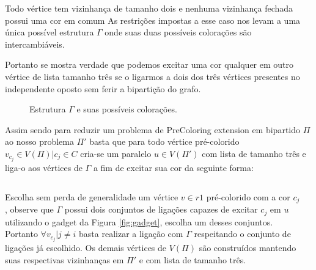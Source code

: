 \documentclass[9pt, compress]{beamer}
\newcommand{\?}{\textcolor{warn}{\textit{?}}}
\begin{document}
     \begin{frame}{Todo vértice tem vizinhança de tamanho dois e nenhuma vizinhança fechada possui uma cor em comum}
       As restrições impostas a esse caso nos levam a uma única possível estrutura $\Gamma$ onde suas duas possíveis colorações são intercambiáveis.
       
       Portanto se mostra verdade que podemos excitar uma cor qualquer em outro vértice de lista tamanho três se o ligarmos a dois dos três vértices presentes no independente oposto sem ferir a bipartição do grafo.
     \end{frame}
     \begin{frame}
      \begin{figure}[H]
        \centering
        \fontsize{4}{10}
        
        \caption{Estrutura $\Gamma$ e suas possíveis colorações.}
        \label{fig:2-edge-b}
      \end{figure}
      
      Assim sendo para reduzir um problema de PreColoring extension em bipartido $\Pi$ ao nosso problema $\Pi'$ basta que para todo vértice pré-colorido $v_{c_j} \in V(\Pi) | c_j \in C$ cria-se um paralelo $u \in V(\Pi')$ com lista de tamanho três e liga-o aos vértices de $\Gamma$ a fim de excitar sua cor da seguinte forma:
      
     \end{frame}
     \begin{frame}
       \begin{columns}
        \begin{column}{0.5\textwidth}
          Escolha sem perda de generalidade um vértice $v \in r1$ pré-colorido com a cor $c_j$, observe que $\Gamma$ possui dois conjuntos de ligações capazes de excitar $c_j$ em $u$ utilizando o gadget da Figura \ref{fig:gadget}, escolha um desses conjuntos. Portanto $\forall v_{c_j} | j \neq i$ basta realizar a ligação com $\Gamma$ respeitando o conjunto de ligações já escolhido. Os demais vértices de $V(\Pi)$ são construídos mantendo suas respectivas vizinhanças em $\Pi'$ e com lista de tamanho três.
        \end{column}
        \begin{column}{0.5\textwidth}
        \end{column}
      \end{columns}
     \end{frame}
     
\end{document}
